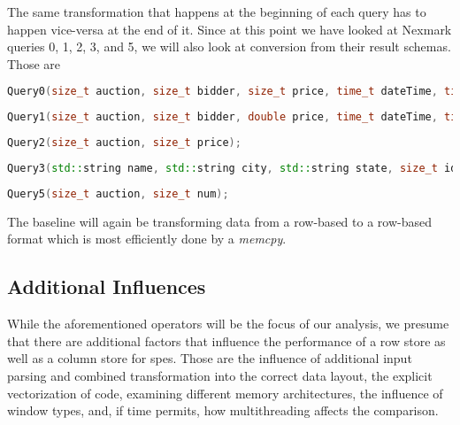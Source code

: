 The same transformation that happens at the beginning of each query has to happen vice-versa at the end of it.
Since at this point we have looked at Nexmark queries 0, 1, 2, 3, and 5, we will also look at conversion from their result schemas.
Those are

\begin{lstlisting}[language=c++]
Query0(size_t auction, size_t bidder, size_t price, time_t dateTime, time_t expires, std::string extra);
\end{lstlisting}

\begin{lstlisting}[language=c++]
Query1(size_t auction, size_t bidder, double price, time_t dateTime, time_t expires, std::string extra);
\end{lstlisting}

\begin{lstlisting}[language=c++]
Query2(size_t auction, size_t price);
\end{lstlisting}
    
\begin{lstlisting}[language=c++]
Query3(std::string name, std::string city, std::string state, size_t id);
\end{lstlisting}

\begin{lstlisting}[language=c++]
Query5(size_t auction, size_t num);
\end{lstlisting}

The baseline will again be transforming data from a row-based to a row-based format which is most efficiently done by a \emph{memcpy}.

\subsection{Additional Influences}

While the aforementioned operators will be the focus of our analysis, we presume that there are additional factors that influence the performance of a row store as well as a column store for \acp{spe}.
Those are the influence of additional input parsing and combined transformation into the correct data layout, the explicit vectorization of code, examining different memory architectures, the influence of window types, and, if time permits, how multithreading affects the comparison.

